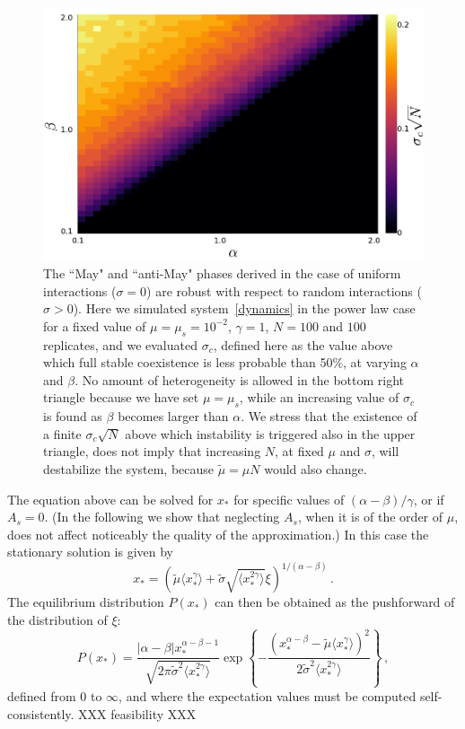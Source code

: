 \documentclass[
 prl,
 twocolumn,
 amsmath,
 amssymb,
 aps,
]{revtex4-2}
\begin{document}
\begin{figure}[t!]
    \includegraphics[width=.45\textwidth]{alpha-beta.pdf}
    \caption{The ``May" and ``anti-May" phases derived in the
    case of uniform interactions ($\sigma = 0$) are robust with respect to random interactions ($\sigma > 0$).
    Here we simulated system~\eqref{dynamics} in the power law case for a fixed value of
    $\mu=\mu_s=10^{-2}$, $\gamma=1$, $N=100$ and $100$ replicates,  
    and we evaluated $\sigma_c$, defined here as
    the value above which full stable coexistence is less probable than 50\%,
    at varying $\alpha$ and $\beta$.
    No amount of heterogeneity is allowed in the bottom right triangle because we have set $\mu=\mu_s$, while an increasing value of $\sigma_c$
    is found as $\beta$ becomes larger than $\alpha$.
    We stress that the existence of a finite $\sigma_c\sqrt{N}$ above which instability is triggered also in the upper triangle,
    does not imply that increasing $N$, at fixed $\mu$ and $\sigma$, will destabilize the system, because $\tilde{\mu}=\mu N$ would also change.
    }
    \label{fig: alpha-beta}
\end{figure}
The equation above can be solved for $x_*$ for specific values of
$(\alpha-\beta)/\gamma$, or if $A_s=0$.
(In the following we show that neglecting $A_s$, when it is of the order of $\mu$, does not affect noticeably the quality of the approximation.) In this case the stationary solution is given by 
\begin{equation} \label{eq: cavity solution}
    x_* = \left( \tilde{\mu} \langle x_*^{\gamma}\rangle + \tilde{\sigma} \sqrt{\langle x_*^{2\gamma}\rangle}\xi\right)^{1/(\alpha-\beta)} \, .
\end{equation}
The equilibrium distribution $P(x_*)$ can then be obtained as the pushforward of the distribution of $\xi$: 
\begin{equation}\label{eq: dist general}
    P(x_*)=\frac{|\alpha-\beta|x_*^{\alpha-\beta-1}}{\sqrt{2\pi\tilde{\sigma}^2 \langle x_*^{2\gamma}\rangle}}
    \exp{\left\{-\frac{(x_*^{\alpha-\beta}- \tilde{\mu} \langle x_*^{\gamma}\rangle)^2}{2\tilde{\sigma}^2\langle x_*^{2\gamma}\rangle}\right\}} \, ,
\end{equation}
defined from $0$  to $\infty$, and where the expectation values must be computed self-consistently. XXX feasibility XXX
\end{document}
